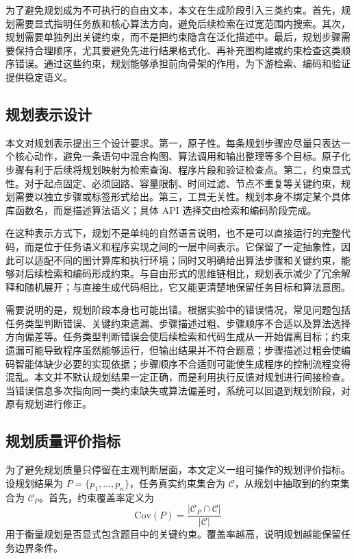 为了避免规划成为不可执行的自由文本，本文在生成阶段引入三类约束。首先，规划需要显式指明任务族和核心算法方向，避免后续检索在过宽范围内搜索。其次，规划需要单独列出关键约束，而不是把约束隐含在泛化描述中。最后，规划步骤需要保持合理顺序，尤其要避免先进行结果格式化、再补充图构建或约束检查这类顺序错误。通过这些约束，规划能够承担前向骨架的作用，为下游检索、编码和验证提供稳定语义。

\subsection{规划表示设计}

本文对规划表示提出三个设计要求。第一，原子性。每条规划步骤应尽量只表达一个核心动作，避免一条语句中混合构图、算法调用和输出整理等多个目标。原子化步骤有利于后续将规划映射为检索查询、程序片段和验证检查点。第二，约束显式性。对于起点固定、必须回路、容量限制、时间过滤、节点不重复等关键约束，规划需要以独立步骤或标签形式给出。第三，工具无关性。规划本身不绑定某个具体库函数名，而是描述算法语义；具体 API 选择交由检索和编码阶段完成。

在这种表示方式下，规划不是单纯的自然语言说明，也不是可以直接运行的完整代码，而是位于任务语义和程序实现之间的一层中间表示。它保留了一定抽象性，因此可以适配不同的图计算库和执行环境；同时又明确给出算法步骤和关键约束，能够对后续检索和编码形成约束。与自由形式的思维链相比，规划表示减少了冗余解释和随机展开；与直接生成代码相比，它又能更清楚地保留任务目标和算法意图。

需要说明的是，规划阶段本身也可能出错。根据实验中的错误情况，常见问题包括任务类型判断错误、关键约束遗漏、步骤描述过粗、步骤顺序不合适以及算法选择方向偏差等。任务类型判断错误会使后续检索和代码生成从一开始偏离目标；约束遗漏可能导致程序虽然能够运行，但输出结果并不符合题意；步骤描述过粗会使编码智能体缺少必要的实现依据；步骤顺序不合适则可能使生成程序的控制流程变得混乱。本文并不默认规划结果一定正确，而是利用执行反馈对规划进行间接检查。当错误信息多次指向同一类约束缺失或算法偏差时，系统可以回退到规划阶段，对原有规划进行修正。

\subsection{规划质量评价指标}

为了避免规划质量只停留在主观判断层面，本文定义一组可操作的规划评价指标。设规划结果为 $P=\{p_1,\ldots,p_n\}$，任务真实约束集合为 $\mathcal{C}$，从规划中抽取到的约束集合为 $\mathcal{C}_P$。首先，约束覆盖率定义为
\begin{equation}
\mathrm{Cov}(P)=\frac{|\mathcal{C}_P\cap\mathcal{C}|}{|\mathcal{C}|}
\end{equation}
用于衡量规划是否显式包含题目中的关键约束。覆盖率越高，说明规划越能保留任务边界条件。

